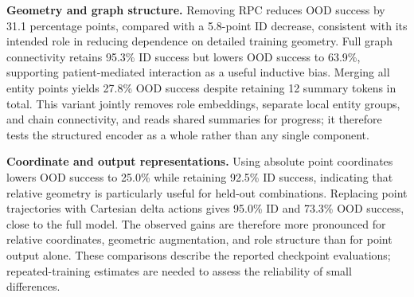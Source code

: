 \textbf{Geometry and graph structure.}
Removing RPC reduces OOD success by 31.1 percentage points, compared with a 5.8-point ID decrease, consistent with its intended role in reducing dependence on detailed training geometry.
Full graph connectivity retains 95.3\% ID success but lowers OOD success to 63.9\%, supporting patient-mediated interaction as a useful inductive bias.
Merging all entity points yields 27.8\% OOD success despite retaining 12 summary tokens in total.
This variant jointly removes role embeddings, separate local entity groups, and chain connectivity, and reads shared summaries for progress; it therefore tests the structured encoder as a whole rather than any single component.

\textbf{Coordinate and output representations.}
Using absolute point coordinates lowers OOD success to 25.0\% while retaining 92.5\% ID success, indicating that relative geometry is particularly useful for held-out combinations.
Replacing point trajectories with Cartesian delta actions gives 95.0\% ID and 73.3\% OOD success, close to the full model.
The observed gains are therefore more pronounced for relative coordinates, geometric augmentation, and role structure than for point output alone.
These comparisons describe the reported checkpoint evaluations; repeated-training estimates are needed to assess the reliability of small differences.

